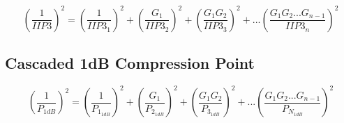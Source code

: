 \begin{equation}
\left ( \frac {1} {IIP3} \right)^2 = \left( \frac {1} {IIP3_1}  \right)^2 + \left( \frac{G_1}{IIP3_2}  \right)^2 + \left( \frac {G_1G_2} {IIP3_3}  \right)^2 + ...\left( \frac {G_1G_2...G_{n-1}} {IIP3_n}  \right)^2
\end{equation}

\subsection{Cascaded 1dB Compression Point}
\begin{equation}
\left ( \frac {1} {P_{1dB}} \right)^2 = \left( \frac {1} {P_{1_{1dB}}}  \right)^2 + \left( \frac{G_1}{P_{2_{1dB}}}  \right)^2 + \left( \frac {G_1G_2} {P_{3_{1dB}}}  \right)^2 + ...\left( \frac {G_1G_2...G_{n-1}} {P_{N_{1dB}}}  \right)^2
\end{equation}




